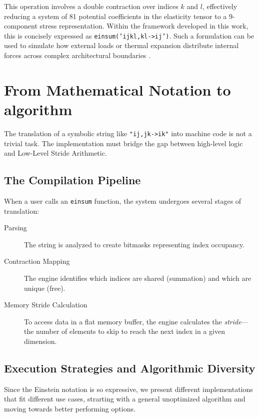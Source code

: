 \documentclass[binding=0.6cm]{sapthesis}
\begin{document}
This operation involves a double contraction over indices $k$ and $l$, effectively reducing a system of 81 potential coefficients in the elasticity tensor to a 9-component stress representation. Within the framework developed in this work, this is concisely expressed as \texttt{einsum('ijkl,kl->ij')}. Such a formulation can be used to simulate how external loads or thermal expansion distribute internal forces across complex architectural boundaries \cite{gurtin1981continuum}.

\section{From Mathematical Notation to algorithm}

The translation of a symbolic string like \texttt{"ij,jk->ik"} into machine code is not a trivial task. The implementation must bridge the gap between high-level logic and Low-Level Stride Arithmetic.

\subsection{The Compilation Pipeline}

When a user calls an \texttt{einsum} function, the system undergoes several stages of translation:
\begin{description}
	\item [Parsing] The string is analyzed to create bitmasks representing index occupancy.
	\item [Contraction Mapping] The engine identifies which indices are shared (summation) and which are unique (free).
	\item [Memory Stride Calculation] To access data in a flat memory buffer, the engine calculates the \textit{stride}—the number of elements to skip to reach the next index in a given dimension.
\end{description}

\subsection{Execution Strategies and Algorithmic Diversity}

Since the Einstein notation is so expressive, we present different implementations that fit different use cases, strarting with a general unoptimized algorithm and moving towards better performing options.
\end{document}
